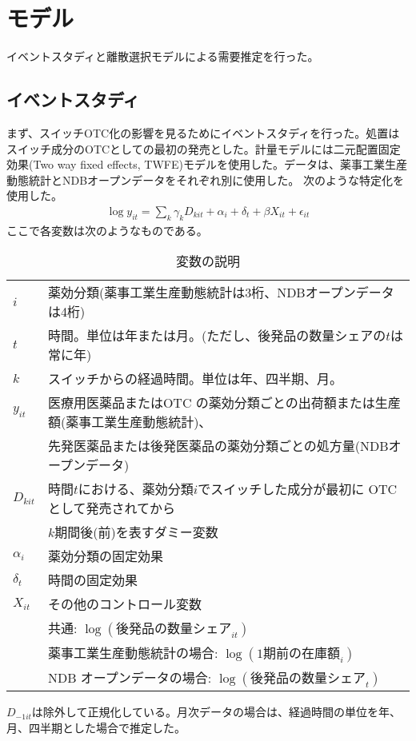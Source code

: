 \documentclass[a4paper,11pt,uplatex]{jsarticle}
\theoremstyle{definition}
\begin{document}
\section{モデル}
イベントスタディと離散選択モデルによる需要推定を行った。
\subsection{イベントスタディ}
まず、スイッチOTC化の影響を見るためにイベントスタディを行った。処置はスイッチ成分のOTCとしての最初の発売とした。計量モデルには二元配置固定効果(Two way fixed effects, TWFE)モデルを使用した。データは、薬事工業生産動態統計とNDBオープンデータをそれぞれ別に使用した。
次のような特定化を使用した。
\begin{align*}
\log y_{it} =\sum_k \gamma_k D_{kit}+\alpha_i +\delta_t+\beta X_{it}+\epsilon_{it}
\end{align*}
ここで各変数は次のようなものである。
\begin{table}[H] \caption{変数の説明}
    \begin{tabular}{ll}
       \toprule 
       \(i\)&薬効分類(薬事工業生産動態統計は3桁、NDBオープンデータは4桁)\\
       \(t\)&時間。単位は年または月。(ただし、後発品の数量シェアの\(t\)は常に年)\\
       \(k\)&スイッチからの経過時間。単位は年、四半期、月。\\
    $y_{it}$ & 医療用医薬品またはOTC の薬効分類ごとの出荷額または生産額(薬事工業生産動態統計)、\\
    & 先発医薬品または後発医薬品の薬効分類ごとの処方量(NDBオープンデータ)\\
    $D_{kit}$ & 時間\(t\)における、薬効分類\(i\)でスイッチした成分が最初に OTC として発売されてから\\
    & \(k\)期間後(前)を表すダミー変数\\
    $\alpha_i$ & 薬効分類の固定効果\\
    $\delta_t$ & 時間の固定効果\\
    $X_{it}$ & その他のコントロール変数\\
    & 共通: $\log(後発品の数量シェア_{it})$\\
    & 薬事工業生産動態統計の場合: $\log(1期前の在庫額_i)$\\
    & \textrm{NDB} オープンデータの場合: $\log(後発品の数量シェア_t)$ \\
    \bottomrule
    \end{tabular}
\end{table}
\(D_{-1it}\)は除外して正規化している。月次データの場合は、経過時間の単位を年、月、四半期とした場合で推定した。
\end{document}
